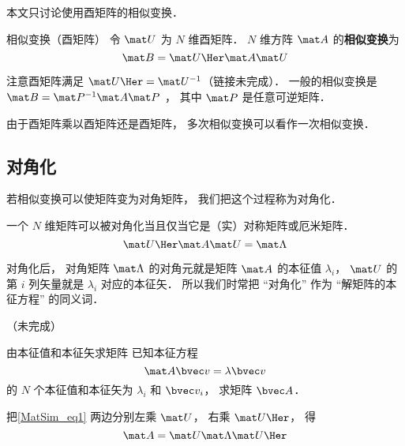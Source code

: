 
本文只讨论使用酉矩阵的相似变换．

\begin{definition}{相似变换（酉矩阵）}\label{MatSim_def1}
令 $\mat U$ 为 $N$ 维酉矩阵． $N$ 维方阵 $\mat A$ 的\textbf{相似变换}为
\begin{equation}
\mat B = \mat U\Her \mat A \mat U
\end{equation}
\end{definition}

注意酉矩阵满足 $\mat U\Her = \mat U^{-1}$（链接未完成）． 一般的相似变换是 $\mat B = \mat P^{-1} \mat A \mat P$ ， 其中 $\mat P$ 是任意可逆矩阵．

由于酉矩阵乘以酉矩阵还是酉矩阵， 多次相似变换可以看作一次相似变换．

\subsection{对角化}
若相似变换可以使矩阵变为对角矩阵， 我们把这个过程称为对角化．

一个 $N$ 维矩阵可以被对角化当且仅当它是（实）对称矩阵或厄米矩阵．
\begin{equation}\label{MatSim_eq1}
\mat U\Her \mat A \mat U = \mat \Lambda
\end{equation}

对角化后， 对角矩阵 $\mat \Lambda$ 的对角元就是矩阵 $\mat A$ 的本征值 $\lambda_i$， $\mat U$ 的第 $i$ 列矢量就是 $\lambda_i$ 对应的本征矢． 所以我们时常把 “对角化” 作为 “解矩阵的本征方程” 的同义词．

（未完成）

\begin{example}{由本征值和本征矢求矩阵}
已知本征方程
\begin{equation}
\mat A \bvec v = \lambda \bvec v
\end{equation}
的 $N$ 个本征值和本征矢为 $\lambda_i$ 和 $\bvec v_i$， 求矩阵 $\bvec A$．

把\autoref{MatSim_eq1} 两边分别左乘 $\mat U$， 右乘 $\mat U\Her$， 得
\begin{equation}
\mat A = \mat U \mat \Lambda \mat U\Her
\end{equation}
\end{example}
